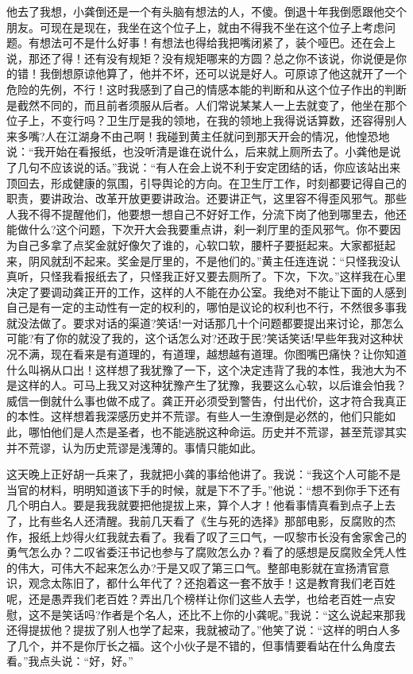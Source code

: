 \documentclass[12pt,oneside]{book}
\begin{document}
他去了我想，小龚倒还是一个有头脑有想法的人，不傻。倒退十年我倒愿跟他交个朋友。可现在是现在，我坐在这个位子上，就由不得我不坐在这个位子上考虑问题。有想法可不是什么好事！有想法也得给我把嘴闭紧了，装个哑巴。还在会上说，那还了得！还有没有规矩？没有规矩哪来的方圆？总之你不该说，你说便是你的错！我倒想原谅他算了，他并不坏，还可以说是好人。可原谅了他这就开了一个危险的先例，不行！这时我感到了自己的情感本能的判断和从这个位子作出的判断是截然不同的，而且前者须服从后者。人们常说某某人一上去就变了，他坐在那个位子上，不变行吗？卫生厅是我的领地，在我的领地上我得说话算数，还容得别人来多嘴?人在江湖身不由己啊！我碰到黄主任就问到那天开会的情况，他惶恐地说：``我开始在看报纸，也没听清是谁在说什么，后来就上厕所去了。小龚他是说了几句不应该说的话。''我说：``有人在会上说不利于安定团结的话，你应该站出来顶回去，形成健康的氛围，引导舆论的方向。在卫生厅工作，时刻都要记得自己的职责，要讲政治、改革开放更要讲政治。还要讲正气，这里容不得歪风邪气。那些人我不得不提醒他们，他要想一想自己不好好工作，分流下岗了他到哪里去，他还能做什么?这个问题，下次开大会我要重点讲，刹一刹厅里的歪风邪气。你不要因为自己多拿了点奖金就好像欠了谁的，心软口软，腰杆子要挺起来。大家都挺起来，阴风就刮不起来。奖金是厅里的，不是他们的。''黄主任连连说：``只怪我没认真听，只怪我看报纸去了，只怪我正好又要去厕所了。下次，下次。''这样我在心里决定了要调动龚正开的工作，这样的人不能在办公室。我绝对不能让下面的人感到自己是有一定的主动性有一定的权利的，哪怕是议论的权利也不行，不然很多事我就没法做了。要求对话的渠道?笑话!一对话那几十个问题都要提出来讨论，那怎么可能?有了你的就没了我的，这个话怎么对?还政于民?笑话笑话!早些年我对这种状况不满，现在看来是有道理的，有道理，越想越有道理。你图嘴巴痛快？让你知道什么叫祸从口出！这样想了我犹豫了一下，这个决定违背了我的本性，我池大为不是这样的人。可马上我又对这种犹豫产生了犹豫，我要这么心软，以后谁会怕我？威信一倒就什么事也做不成了。龚正开必须受到警告，付出代价，这才符合我真正的本性。这样想着我深感历史并不荒谬。有些人一生潦倒是必然的，他们只能如此，哪怕他们是人杰是圣者，也不能逃脱这种命运。历史并不荒谬，甚至荒谬其实并不荒谬，认为历史荒谬是浅薄的。事情只能如此。

这天晚上正好胡一兵来了，我就把小龚的事给他讲了。我说：``我这个人可能不是当官的材料，明明知道该下手的时候，就是下不了手。''他说：``想不到你手下还有几个明白人。要是我我就要把他提拔上来，算个人才！他看事情真看到点子上去了，比有些名人还清醒。我前几天看了《生与死的选择》那部电影，反腐败的杰作，报纸上炒得火红我就去看了。我看了叹了三口气，一叹黎市长没有舍家舍己的勇气怎么办？二叹省委汪书记也参与了腐败怎么办？看了的感想是反腐败全凭人性的伟大，可伟大不起来怎么办?于是又叹了第三口气。整部电影就在宣扬清官意识，观念太陈旧了，都什么年代了？还抱着这一套不放手！这是教育我们老百姓呢，还是愚弄我们老百姓？弄出几个榜样让你们这些人去学，也给老百姓一点安慰，这不是笑话吗?作者是个名人，还比不上你的小龚呢。''我说：``这么说起来那我还得提拔他？提拔了别人也学了起来，我就被动了。''他笑了说：``这样的明白人多了几个，并不是你厅长之福。这个小伙子是不错的，但事情要看站在什么角度去看。''我点头说：``好，好。''
\end{document}
